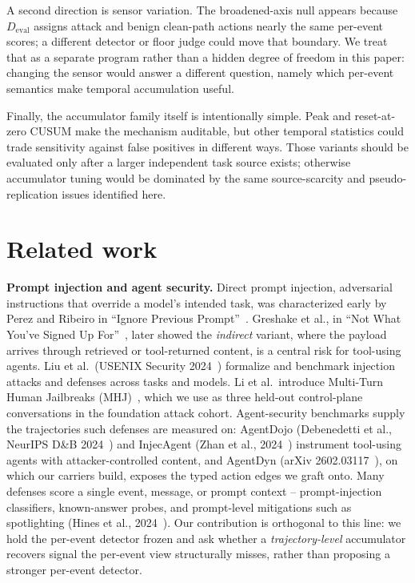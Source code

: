 \documentclass[11pt]{article}
\newcommand{\Deval}{\ensuremath{D_{\mathrm{eval}}}}
\begin{document}
A second direction is sensor variation. The broadened-axis null appears because \Deval{} assigns
attack and benign clean-path actions nearly the same per-event scores; a different detector or floor
judge could move that boundary. We treat that as a separate program rather than a hidden degree of
freedom in this paper: changing the sensor would answer a different question, namely which per-event
semantics make temporal accumulation useful.

Finally, the accumulator family itself is intentionally simple. Peak and reset-at-zero CUSUM make the
mechanism auditable, but other temporal statistics could trade sensitivity against false positives in
different ways. Those variants should be evaluated only after a larger independent task source exists;
otherwise accumulator tuning would be dominated by the same source-scarcity and pseudo-replication
issues identified here.

\section{Related work}

\textbf{Prompt injection and agent security.} Direct prompt injection, adversarial instructions that override a model's intended task, was characterized early by Perez and Ribeiro in ``Ignore Previous Prompt''~\citep{perez2022promptinject}. Greshake et al., in ``Not What You've Signed Up For''~\citep{greshake2023indirect}, later showed the \emph{indirect}
variant, where the payload arrives through retrieved or tool-returned content, is a central risk
for tool-using agents. Liu et al.\ (USENIX Security 2024~\citep{liu2024formalizing}) formalize and benchmark injection attacks
and defenses across tasks and models. Li et al.\ introduce Multi-Turn Human Jailbreaks (MHJ)~\citep{li2024mhj}, which
we use as three held-out control-plane conversations in the foundation attack cohort.
Agent-security benchmarks supply the trajectories such defenses are measured on: AgentDojo
(Debenedetti et al., NeurIPS D\&B 2024~\citep{debenedetti2024agentdojo}) and InjecAgent (Zhan et al., 2024~\citep{zhan2024injecagent}) instrument tool-using
agents with attacker-controlled content, and AgentDyn (arXiv 2602.03117~\citep{agentdyn2026}), on which our carriers
build, exposes the typed action edges we graft onto. Many defenses score a single event, message, or
prompt context -- prompt-injection classifiers, known-answer probes, and prompt-level mitigations
such as spotlighting (Hines et al., 2024~\citep{hines2024spotlighting}). Our contribution is orthogonal to this line: we hold the
per-event detector frozen and ask whether a \emph{trajectory-level} accumulator recovers signal the
per-event view structurally misses, rather than proposing a stronger per-event detector.
\end{document}
